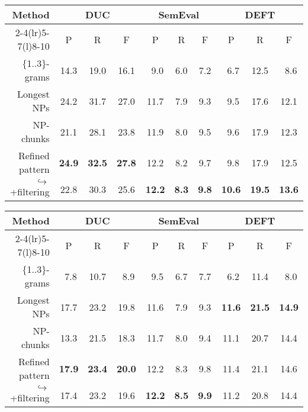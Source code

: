       \begin{table*}
        \centering
        \begin{tabular}{@{}rccccccccc@{}}
          \toprule
          \multirow{2}{*}[-2pt]{\textbf{Method}} & \multicolumn{3}{c}{\textbf{DUC}} & \multicolumn{3}{c}{\textbf{SemEval}} & \multicolumn{3}{c}{\textbf{DEFT}}\\
          \cmidrule(r){2-4}\cmidrule(lr){5-7}\cmidrule(l){8-10}
          & P & R & F & P & R & F & P & R & F\\
          \midrule
          \{1..3\}-grams & 14.3 & 19.0 & 16.1 & $~~$9.0 & $~~$6.0 & $~~$7.2 & $~~$6.7 & 12.5 & $~~$8.6\\
          Longest NPs & 24.2 & 31.7 & 27.0 & 11.7 & $~~$7.9 & $~~$9.3 & $~~$9.5 & 17.6 & 12.1\\
          NP-chunks & 21.1 & 28.1 & 23.8 & 11.9 & $~~$8.0 & $~~$9.5 & $~~$9.6 & 17.9 & 12.3\\
          Refined pattern & \textbf{24.9} & \textbf{32.5} & \textbf{27.8} & 12.2 & $~~$8.2 & $~~$9.7 & $~~$9.8 & 17.9 & 12.5\\
          $\hookrightarrow$\hfill{}+filtering & 22.8 & 30.3 & 25.6 & \textbf{12.2} & \textbf{$~~$8.3} & \textbf{$~~$9.8} & \textbf{10.6} & \textbf{19.5} & \textbf{13.6}\\
          \bottomrule
        \end{tabular}
        \caption{Comparison of candidate selection methods, when 10 keyphrases
                 are extracted by \textbf{TF-IDF}.
                 \label{tab:tfidf_results}}
      \end{table*}
      \begin{table*}
        \centering
        \begin{tabular}{@{}rccccccccc@{}}
          \toprule
          \multirow{2}{*}[-2pt]{\textbf{Method}} & \multicolumn{3}{c}{\textbf{DUC}} & \multicolumn{3}{c}{\textbf{SemEval}} & \multicolumn{3}{c}{\textbf{DEFT}}\\
          \cmidrule(r){2-4}\cmidrule(lr){5-7}\cmidrule(l){8-10}
          & P & R & F & P & R & F & P & R & F\\
          \midrule
          \{1..3\}-grams & $~~$7.8 & 10.7 & $~~$8.9 & $~~$9.5 & $~~$6.7 & $~~$7.7 & $~~$6.2 & 11.4 & $~~$8.0\\
          Longest NPs & 17.7 & 23.2 & 19.8 & 11.6 & $~~$7.9 & $~~$9.3 & \textbf{11.6} & \textbf{21.5} & \textbf{14.9}\\
          NP-chunks & 13.3 & 21.5 & 18.3 & 11.7 & $~~$8.0 & $~~$9.4 & 11.1 & 20.7 & 14.4\\
          Refined pattern & \textbf{17.9} & \textbf{23.4} & \textbf{20.0} & 12.2 & $~~$8.3 & $~~$9.8 & 11.4 & 21.1 & 14.6\\
          $\hookrightarrow$\hfill{}+filtering & 17.4 & 23.2 & 19.6 & \textbf{12.2} & \textbf{$~~$8.5} & \textbf{$~~$9.9} & 11.2 & 20.8 & 14.4\\
          \bottomrule
        \end{tabular}
        \caption{Comparison of candidate selection methods, when 10 keyphrases
                 are extracted by \textbf{TopicRank}.
                 \label{tab:topicrank_results}}
      \end{table*}
